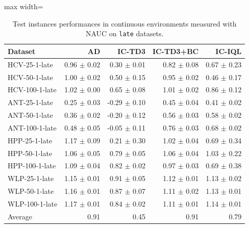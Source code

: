 \documentclass{article}
\begin{document}
\begin{table}[ht]
    \label{tab:}
    \begin{center}
    \caption{Test instances performances in continuous environments measured with NAUC on \texttt{late} datasets.}
    \begin{small}
    \begin{adjustbox}{max width=\columnwidth}
		\begin{tabular}{l|rrrr}
		\toprule
	\textbf{Dataset} & \textbf{AD} & \textbf{IC-TD3} & \textbf{IC-TD3+BC} & \textbf{IC-IQL}\\
\midrule
HCV-25-1-late & 0.96 $\pm$ 0.02 & 0.30 $\pm$ 0.01 & 0.82 $\pm$ 0.08 & 0.67 $\pm$ 0.23\\
HCV-50-1-late & 1.00 $\pm$ 0.02 & 0.50 $\pm$ 0.15 & 0.95 $\pm$ 0.02 & 0.46 $\pm$ 0.17\\
HCV-100-1-late & 1.02 $\pm$ 0.00 & 0.65 $\pm$ 0.08 & 1.01 $\pm$ 0.02 & 0.86 $\pm$ 0.12\\
ANT-25-1-late & 0.25 $\pm$ 0.03 & -0.29 $\pm$ 0.10 & 0.45 $\pm$ 0.04 & 0.41 $\pm$ 0.02\\
ANT-50-1-late & 0.36 $\pm$ 0.02 & -0.20 $\pm$ 0.12 & 0.56 $\pm$ 0.03 & 0.58 $\pm$ 0.02\\
ANT-100-1-late & 0.48 $\pm$ 0.05 & -0.05 $\pm$ 0.11 & 0.76 $\pm$ 0.03 & 0.68 $\pm$ 0.02\\
HPP-25-1-late & 1.17 $\pm$ 0.09 & 0.21 $\pm$ 0.30 & 1.02 $\pm$ 0.04 & 0.69 $\pm$ 0.34\\
HPP-50-1-late & 1.06 $\pm$ 0.05 & 0.79 $\pm$ 0.05 & 1.06 $\pm$ 0.04 & 1.03 $\pm$ 0.22\\
HPP-100-1-late & 1.09 $\pm$ 0.04 & 0.82 $\pm$ 0.02 & 0.97 $\pm$ 0.03 & 0.69 $\pm$ 0.38\\
WLP-25-1-late & 1.15 $\pm$ 0.01 & 0.91 $\pm$ 0.05 & 1.12 $\pm$ 0.01 & 1.13 $\pm$ 0.02\\
WLP-50-1-late & 1.16 $\pm$ 0.01 & 0.87 $\pm$ 0.07 & 1.11 $\pm$ 0.02 & 1.13 $\pm$ 0.01\\
WLP-100-1-late & 1.17 $\pm$ 0.01 & 0.84 $\pm$ 0.02 & 1.11 $\pm$ 0.01 & 1.14 $\pm$ 0.01\\
\midrule
Average & 0.91 & 0.45 & 0.91 & 0.79\\
\end{tabular}
        \end{adjustbox}
    \end{small}
    \end{center}
    \vskip -0.1in
\end{table}
\end{document}

